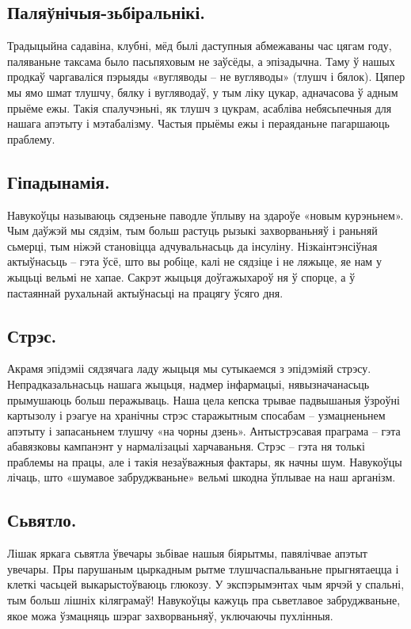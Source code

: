 \subsection{Паляўнічыя-зьбіральнікі.}
Традыцыйна садавіна, клубні, мёд былі даступныя абмежаваны час цягам году, паляваньне таксама было пасьпяховым не заўсёды, а эпізадычна. Таму ў нашых продкаў чаргаваліся пэрыяды «вугляводы – не вугляводы» (тлушч і бялок). Цяпер мы ямо шмат тлушчу, бялку і вугляводаў, у тым ліку цукар, адначасова ў адным прыёме ежы. Такія спалучэньні, як тлушч з цукрам, асабліва небясьпечныя для нашага апэтыту і мэтабалізму. Частыя прыёмы ежы і пераяданьне пагаршаюць праблему.

\subsection{Гіпадынамія.}
Навукоўцы называюць сядзеньне паводле ўплыву на здароўе «новым курэньнем». Чым даўжэй мы сядзім, тым больш растуць рызыкі захворваньняў і раньняй сьмерці, тым ніжэй становіцца адчувальнасьць да інсуліну. Нізкаінтэнсіўная актыўнасьць – гэта ўсё, што вы робіце, калі не сядзіце і не ляжыце, яе нам у жыцьці вельмі не хапае. Сакрэт жыцьця доўгажыхароў ня ў спорце, а ў пастаяннай рухальнай актыўнасьці на працягу ўсяго дня.

\subsection{Стрэс.}
Акрамя эпідэміі сядзячага ладу жыцьця мы сутыкаемся з эпідэміяй стрэсу. Непрадказальнасьць нашага жыцьця, надмер інфармацыі, нявызначанасьць прымушаюць больш перажываць. Наша цела кепска трывае падвышаныя ўзроўні картызолу і рэагуе на хранічны стрэс старажытным спосабам – узмацненьнем апэтыту і запасаньнем тлушчу «на чорны дзень». Антыстрэсавая праграма – гэта абавязковы кампанэнт у нармалізацыі харчаваньня. Стрэс – гэта ня толькі праблемы на працы, але і такія незаўважныя фактары, як начны шум. Навукоўцы лічаць, што «шумавое забруджваньне» вельмі шкодна ўплывае на наш арганізм.

\subsection{Сьвятло.}
Лішак яркага сьвятла ўвечары зьбівае нашыя біярытмы, павялічвае апэтыт увечары. Пры парушаным цыркадным рытме тлушчаспальваньне прыгнятаецца і клеткі часьцей выкарыстоўваюць глюкозу. У экспэрымэнтах чым ярчэй у спальні, тым больш лішніх кіляграмаў! Навукоўцы кажуць пра сьветлавое забруджваньне, якое можа ўзмацняць шэраг захворваньняў, уключаючы пухлінныя.

